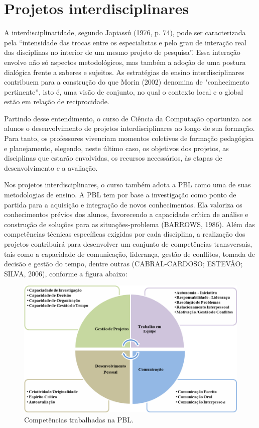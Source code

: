 \documentclass[
	12pt,				%
	openright,			%
  oneside,     %
	a4paper,			%
	chapter=TITLE,		%
	english,			%
	french,				%
	spanish,			%
	brazil				%
	]{abntex2}
\begin{document}
\section{Projetos interdisciplinares}

A interdisciplinaridade, segundo Japiassú (1976, p. 74), pode ser caracterizada pela “intensidade das trocas entre os especialistas e pelo grau de interação real das disciplinas no interior de um mesmo projeto de pesquisa”. Essa interação envolve não só aspectos metodológicos, mas também a adoção de uma postura dialógica frente a saberes e sujeitos. As estratégias de ensino interdisciplinares contribuem para a construção do que Morin (2002) denomina de "conhecimento pertinente”, isto é, uma visão de conjunto, no qual o contexto local e o global estão em relação de reciprocidade.
	
Partindo desse entendimento, o curso de Ciência da Computação oportuniza aos alunos o desenvolvimento de projetos interdisciplinares ao longo de sua formação. Para tanto, os professores vivenciam momentos coletivos de formação pedagógica e planejamento, elegendo, neste último caso, os objetivos dos projetos, as disciplinas que estarão envolvidas, os recursos necessários, às etapas de desenvolvimento e a avaliação.

Nos projetos interdisciplinares, o curso também adota a PBL como uma de suas metodologias de ensino. A PBL tem por base a investigação como ponto de partida para a aquisição e integração de novos conhecimentos. Ela valoriza os conhecimentos prévios dos alunos, favorecendo a capacidade crítica de análise e construção de soluções para as situações-problema (BARROWS, 1986). Além das competências técnicas específicas exigidas por cada disciplina, a realização dos projetos contribuirá para desenvolver um conjunto de competências transversais, tais como a capacidade de comunicação, liderança, gestão de conflitos, tomada de decisão e gestão do tempo, dentre outras (CABRAL-CARDOSO; ESTEVÃO; SILVA, 2006), conforme a figura abaixo:

\begin{figure}[!htb]
    \centering
    \caption{\label{fig:competencias-pbl}Competências trabalhadas na PBL.}
    
    \includegraphics[width=\textwidth]{images/competencias_pbl.png}
  \end{figure}
\end{document}
